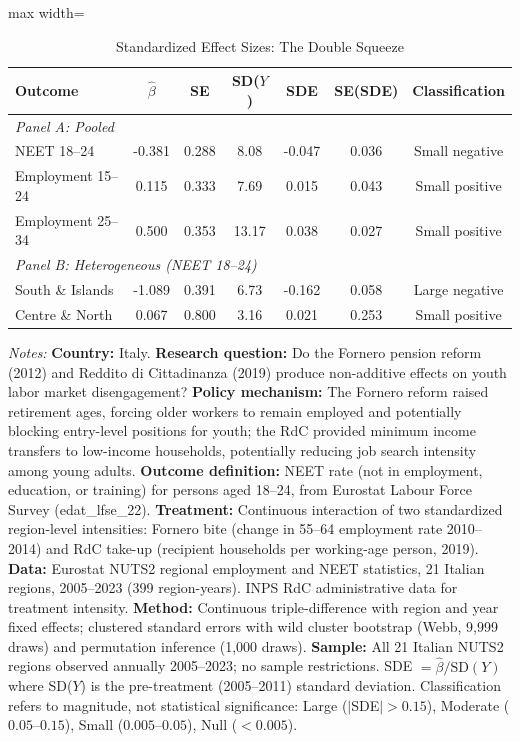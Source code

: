 \begin{table}[t]
\centering
\caption{Standardized Effect Sizes: The Double Squeeze}
\label{tab:sde}
\begin{adjustbox}{max width=\textwidth}
\begin{threeparttable}
\begin{tabular}{lcccccc}
\toprule
Outcome & $\hat{\beta}$ & SE & SD($Y$) & SDE & SE(SDE) & Classification \\
\midrule
\multicolumn{7}{l}{\textit{Panel A: Pooled}} \\
NEET 18--24 & -0.381 & 0.288 & 8.08 & -0.047 & 0.036 & Small negative \\
Employment 15--24 & 0.115 & 0.333 & 7.69 & 0.015 & 0.043 & Small positive \\
Employment 25--34 & 0.500 & 0.353 & 13.17 & 0.038 & 0.027 & Small positive \\
\midrule
\multicolumn{7}{l}{\textit{Panel B: Heterogeneous (NEET 18--24)}} \\
South \& Islands & -1.089 & 0.391 & 6.73 & -0.162 & 0.058 & Large negative \\
Centre \& North & 0.067 & 0.800 & 3.16 & 0.021 & 0.253 & Small positive \\
\bottomrule
\end{tabular}
\begin{tablenotes}[flushleft]
\scriptsize
\item \textit{Notes:} \textbf{Country:} Italy. \textbf{Research question:} Do the Fornero pension reform (2012) and Reddito di Cittadinanza (2019) produce non-additive effects on youth labor market disengagement? \textbf{Policy mechanism:} The Fornero reform raised retirement ages, forcing older workers to remain employed and potentially blocking entry-level positions for youth; the RdC provided minimum income transfers to low-income households, potentially reducing job search intensity among young adults. \textbf{Outcome definition:} NEET rate (not in employment, education, or training) for persons aged 18--24, from Eurostat Labour Force Survey (edat\_lfse\_22). \textbf{Treatment:} Continuous interaction of two standardized region-level intensities: Fornero bite (change in 55--64 employment rate 2010--2014) and RdC take-up (recipient households per working-age person, 2019). \textbf{Data:} Eurostat NUTS2 regional employment and NEET statistics, 21 Italian regions, 2005--2023 (399 region-years). INPS RdC administrative data for treatment intensity. \textbf{Method:} Continuous triple-difference with region and year fixed effects; clustered standard errors with wild cluster bootstrap (Webb, 9,999 draws) and permutation inference (1,000 draws). \textbf{Sample:} All 21 Italian NUTS2 regions observed annually 2005--2023; no sample restrictions. SDE $= \hat{\beta} / \text{SD}(Y)$ where SD($Y$) is the pre-treatment (2005--2011) standard deviation. Classification refers to magnitude, not statistical significance: Large ($|$SDE$| > 0.15$), Moderate ($0.05$--$0.15$), Small ($0.005$--$0.05$), Null ($< 0.005$).
\end{tablenotes}
\end{threeparttable}
\end{adjustbox}
\end{table}

